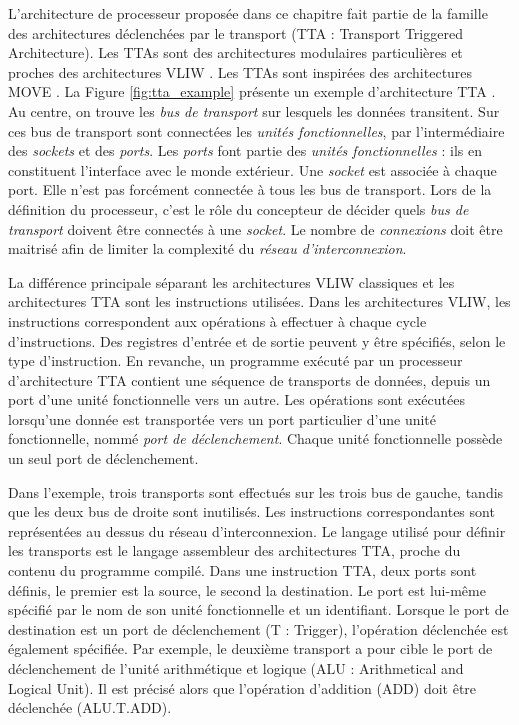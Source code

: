 L'architecture de processeur proposée dans ce chapitre fait partie de la famille des architectures déclenchées par le transport (TTA : Transport Triggered Architecture). Les TTAs sont des architectures modulaires particulières et proches des architectures VLIW \cite{corporaal_microprocessor_1997}. Les TTAs sont inspirées des architectures MOVE \cite{1051344}. La Figure \ref{fig:tta_example} présente un exemple d'architecture TTA \cite{pekka_phd_2012}. Au centre, on trouve les \textit{bus de transport} sur lesquels les données transitent. Sur ces bus de transport sont connectées les \textit{unités fonctionnelles}, par l'intermédiaire des \textit{sockets} et des \textit{ports}. Les \textit{ports} font partie des \textit{unités fonctionnelles} : ils en constituent l'interface avec le monde extérieur. Une \textit{socket} est associée à chaque port. Elle n'est pas forcément connectée à tous les bus de transport. Lors de la définition du processeur, c'est le rôle du concepteur de décider quels \textit{bus de transport} doivent être connectés à une \textit{socket}. Le nombre de \textit{connexions} doit être maitrisé afin de limiter la complexité du \textit{réseau d'interconnexion}.

La différence principale séparant les architectures VLIW classiques et les architectures TTA sont les instructions utilisées. Dans les architectures VLIW, les instructions correspondent aux opérations à effectuer à chaque cycle d'instructions. Des registres d'entrée et de sortie peuvent y être spécifiés, selon le type d'instruction. En revanche, un programme exécuté par un processeur d'architecture TTA contient une séquence de transports de données, depuis un port d'une unité fonctionnelle vers un autre. Les opérations sont exécutées lorsqu'une donnée est transportée vers un port particulier d'une unité fonctionnelle, nommé \textit{port de déclenchement}. Chaque unité fonctionnelle possède un seul port de déclenchement.

Dans l'exemple, trois transports sont effectués sur les trois bus de gauche, tandis que les deux bus de droite sont inutilisés. Les instructions correspondantes sont représentées au dessus du réseau d'interconnexion. Le langage utilisé pour définir les transports est le langage assembleur des architectures TTA, proche du contenu du programme compilé. Dans une instruction TTA, deux ports sont définis, le premier est la source, le second la destination. Le port est lui-même spécifié par le nom de son unité fonctionnelle et un identifiant. Lorsque le port de destination est un port de déclenchement (T : Trigger), l'opération déclenchée est également spécifiée. Par exemple, le deuxième transport a pour cible le port de déclenchement de l'unité arithmétique et logique (ALU : Arithmetical and Logical Unit). Il est précisé alors que l'opération d'addition (ADD) doit être déclenchée (ALU.T.ADD).

